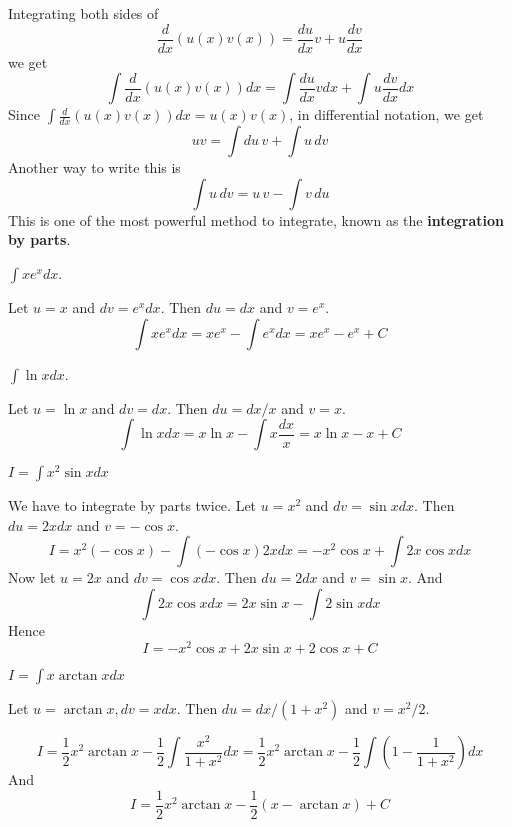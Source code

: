 \documentclass[../calc1-main.tex]{subfiles}
\begin{document}
Integrating both sides of
\[
	\frac{d}{dx} (u(x) v(x)) = \frac{du}{dx} v + u \frac{dv}{dx}
\]
we get
\[
	\int \frac{d}{dx} (u(x) v(x)) dx = \int \frac{du}{dx} v dx + \int u \frac{dv}{dx} dx
\]
Since $\int \frac{d}{dx} (u(x) v(x)) dx = u(x) v(x)$, in differential notation, we get
\[
	u v = \int du \, v + \int u \, dv
\]
Another way to write this is
\[
	\int u \, dv = u\, v - \int v \, du
\]
This is one of the most powerful method to integrate, known as the \textbf{integration by parts}.

\begin{example}
	$\displaystyle \int x e^x dx$.
\end{example}
\begin{solution}
	Let $u = x$ and $dv = e^x dx$. Then $du = dx$ and $v = e^x$.
	\[
		\int x e^x dx = x e^x - \int e^x dx = x e^x - e^x + C
	\]
\end{solution}

\begin{example}
	$\displaystyle \int \ln x dx$.
\end{example}
\begin{solution}
	Let $u = \ln x$ and $dv = dx$. Then $du = dx/x$ and $v = x$.
	\[
		\int \ln x dx = x \ln x - \int x \frac{dx}{x} = x \ln x - x + C
	\]
\end{solution}

\begin{example}
	$I=\displaystyle \int x^2 \sin x dx$
\end{example}
\begin{solution}
	We have to integrate by parts twice. Let $u = x^2$ and $dv = \sin x dx$. Then $du = 2x dx$ and $v = -\cos x$.
	\[
		I = x^2 (-\cos x) - \int (-\cos x) 2x dx = - x^2 \cos x + \int 2x \cos x dx
	\]
	Now let $u = 2x$ and $dv = \cos x dx$. Then $du = 2 dx$ and $v = \sin x$. And
	\[
		\int 2x \cos x dx = 2x \sin x - \int 2 \sin x dx
	\]
	Hence
	\[
		I = -x^2 \cos x + 2x \sin x +2 \cos x + C
	\]
\end{solution}

\begin{example}
	$I = \displaystyle \int x \arctan x dx$
\end{example}
\begin{solution}
	Let $u=\arctan x, dv = x dx$. Then $du = dx/(1+x^2)$ and $v = x^2/2$.

	\[
		I = \frac{1}{2} x^2 \arctan x -\frac{1}{2} \int \frac{x^2}{1+x^2} dx
		= \frac{1}{2} x^2 \arctan x -\frac{1}{2} \int \left( 1- \frac{1}{1+x^2} \right) dx
	\]
	And
	\[
		I = \frac{1}{2} x^2 \arctan x - \frac{1}{2} (x - \arctan x) + C
	\]
\end{solution}
\end{document}
